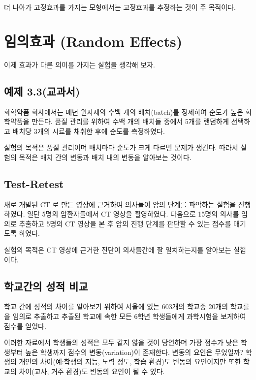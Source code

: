 \documentclass[
]{book}
\begin{document}
더 나아가 고정효과를 가지는 모형에서는 고정효과를 추정하는 것이 주 목적이다.

\hypertarget{uxc784uxc758uxd6a8uxacfc-random-effects}{%
\section{임의효과 (Random Effects)}\label{uxc784uxc758uxd6a8uxacfc-random-effects}}

이제 효과가 다른 의미를 가지는 실험을 생각해 보자.

\hypertarget{uxc608uxc81c-3.3uxad50uxacfcuxc11c}{%
\subsection{예제 3.3(교과서)}\label{uxc608uxc81c-3.3uxad50uxacfcuxc11c}}

화학약품 회사에서는 매년 원자재의 수백 개의 배치(batch)를 정제하여 순도가 높은 화학약품을 만든다. 품질 관리를 위하여 수백 개의 배치들 중에서 5개를 랜덤하게 선택하고 배치당 3개의 시료를 채취한 후에 순도를 측정하였다.

실험의 목적은 품질 관리이며 배치마다 순도가 크게 다르면 문제가 생긴다. 따라서 실험의 목적은 배치 간의 변동과 배치 내의 변동을 알아보는 것이다.

\hypertarget{test-retest}{%
\subsection{Test-Retest}\label{test-retest}}

새로 개발된 CT 로 만든 영상에 근거하여 의사들이 암의 단계를 파악하는 실험을 진행하였다. 일단 5명의 암환자들에서 CT 영상을 쵤영하였다. 다음으로 15명의 의사를 임의로 추출하고 5명의 CT 영상을 본 후 암의 진행 단계를 판단할 수 있는 점수를 매기도록 하였다.

실험의 목적은 CT 영상에 근거한 진단이 의사들간에 잘 일치하는지를 알아보는 실험이다.

\hypertarget{uxd559uxad50uxac04uxc758-uxc131uxc801-uxbe44uxad50}{%
\subsection{학교간의 성적 비교}\label{uxd559uxad50uxac04uxc758-uxc131uxc801-uxbe44uxad50}}

학교 간에 성적의 차이를 알아보기 위하여 서울에 있는 603개의 학교중 20개의 학교를을 임의로 추출하고 추출된 학교에 속한 모든 6학년 학생들에게 과학시험을 보게하여 점수를 얻었다.

이러한 자료에서 학생들의 성적은 모두 같지 않을 것이 당연하며 가장 점수가 낮은 학생부터 높은 학생까지 점수의 변동(variation)이 존재한다. 변동의 요인은 무었일까? 학생의 개인의 차이(예:학생의 지능, 노력 정도, 학습 환경)도 변동의 요인이지만 또한 학교의 차이(교사, 거주 환경)도 변동의 요인이 될 수 있다.
\end{document}
